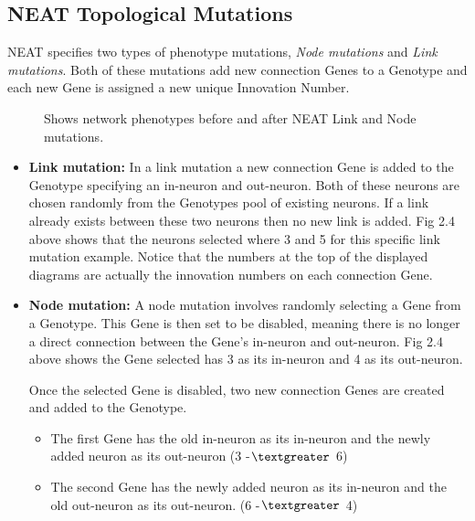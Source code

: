 \documentclass[]{Learning-to-Play-Wolfenstein-thesis}
\begin{document}
\subsection{\label{subsection2.3.3}NEAT Topological Mutations}
NEAT specifies two types of phenotype mutations, \textit{Node mutations} and \textit{Link mutations}. Both of these mutations add new connection Genes to a Genotype and each new Gene is assigned a new unique Innovation Number. ~\cite{NEAT:topmut}
\begin{figure}[h]
\centering
\fboxsep 2mm
\caption{\label{fig:NEAT_mutations} Shows network phenotypes before and after NEAT Link and Node mutations.}
\end{figure} 
\begin{itemize}
\item\textbf{Link mutation:} In a link mutation a new connection Gene is added to the Genotype specifying an in-neuron and out-neuron. Both of these neurons are chosen randomly from the Genotypes pool of existing neurons. If a link already exists between these two neurons then no new link is added. Fig 2.4 above shows that the neurons selected where 3 and 5 for this specific link mutation example. Notice that the numbers at the top of the displayed diagrams are actually the innovation numbers on each connection Gene.
\item\textbf{Node mutation:} A node mutation involves randomly selecting a Gene from a Genotype. This Gene is then set to be disabled, meaning there is no longer a direct connection between the Gene's in-neuron and out-neuron. Fig 2.4 above shows the Gene selected has 3 as its in-neuron and 4 as its out-neuron. 

Once the selected Gene is disabled, two new connection Genes are created and added to the Genotype.
\begin{itemize}
\item The first Gene has the old in-neuron as its in-neuron and the newly added neuron as its out-neuron (3 -{$\textgreater$} 6)
\item The second Gene has the newly added neuron as its in-neuron and the old out-neuron as its out-neuron. (6 -{$\textgreater$} 4)
\end{itemize}
\end{itemize}
\end{document}
